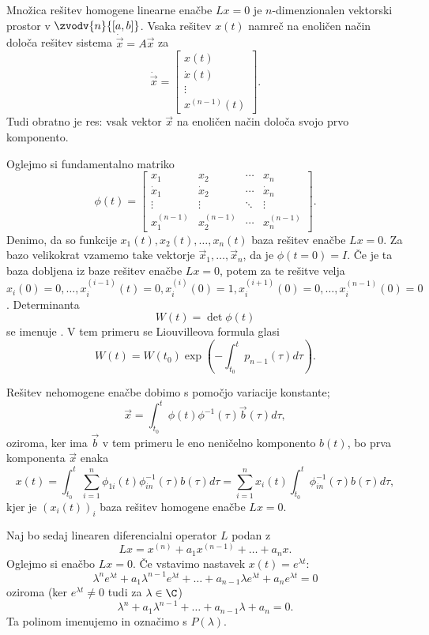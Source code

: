 Množica rešitev homogene linearne enačbe $Lx = 0$ je $n$-dimenzionalen vektorski
prostor v $\zvodv{n}{[a,b]}$.
Vsaka rešitev $x(t)$ namreč na enoličen način določa rešitev sistema
$\dot{\vec{x}} = A \vec{x}$ za
\[
  \dot{\vec{x}}
  =
  \begin{bmatrix}
	x(t) \\ \dot{x}(t) \\ \vdots \\ x^{(n-1)}(t)
  \end{bmatrix}.
\]
Tudi obratno je res: vsak vektor $\vec{x}$ na enoličen način določa svojo prvo
komponento.

Oglejmo si fundamentalno matriko
\[
  \phi(t)
  =
  \begin{bmatrix}
	x_1 & x_2 & \cdots & x_n \\
	\dot{x}_1 & \dot{x}_2 & \cdots & \dot{x}_n \\
	\vdots & \vdots & \ddots & \vdots \\
	x_1^{(n-1)} & x_2^{(n-1)} & \cdots & x_n^{(n-1)}
  \end{bmatrix}.
\]
Denimo, da so funkcije $x_1(t), x_2(t), \ldots, x_n(t)$ baza rešitev enačbe $Lx
= 0$.
Za bazo velikokrat vzamemo take vektorje $\vec{x}_1, \ldots, \vec{x}_n$, da je
$\phi(t=0) = I$.
Če je ta baza dobljena iz baze rešitev enačbe $Lx = 0$, potem za te rešitve
velja $x_i(0) = 0, \ldots, x_i^{(i-1)}(t) = 0, x_i^{(i)}(0) = 1, x_i^{(i+1)}(0)
= 0, \ldots, x_i^{(n-1)}(0) = 0$.
Determinanta
\[
  W(t) = \det \phi(t)
\]
se imenuje .
V tem primeru se Liouvilleova formula glasi
\[
  W(t) = W(t_0) \exp\left( - \int_{t_0}^t p_{n-1}(\tau) d\tau \right).
\]

Rešitev nehomogene enačbe dobimo s pomočjo variacije konstante;
\[
  \vec{x} = \int_{t_0}^t \phi(t) \phi^{-1}(\tau) \vec{b}(\tau) d\tau,
\]
oziroma, ker ima $\vec{b}$ v tem primeru le eno neničelno komponento $b(t)$, bo
prva komponenta $\vec{x}$ enaka
\[
  x(t)
  = \int_{t_0}^t \sum_{i=1}^n \phi_{1i}(t) \phi_{in}^{-1}(\tau) b(\tau) d\tau
  = \sum_{i=1}^n x_i(t) \int_{t_0}^t \phi_{in}^{-1}(\tau) b(\tau) d\tau,
\]
kjer je $(x_i(t))_i$ baza rešitev homogene enačbe $Lx = 0$.



Naj bo sedaj linearen diferencialni operator $L$ podan z
\[
  Lx = x^{(n)} + a_1 x^{(n-1)} + \ldots + a_n x.
\]
Oglejmo si enačbo $Lx = 0$.
Če vstavimo nastavek $x(t) = e^{\lambda t}$:
\[
  \lambda^n e^{\lambda t} + a_1 \lambda^{n-1} e^{\lambda t} + \ldots + a_{n-1}
  \lambda e^{\lambda t} + a_n e^{\lambda t} = 0
\]
oziroma (ker $e^{\lambda t} \ne 0$ tudi za $\lambda \in \C$)
\[
  \lambda^n + a_1 \lambda^{n-1} + \ldots + a_{n-1} \lambda + a_n = 0.
\]
Ta polinom imenujemo  in označimo
s $P(\lambda)$.

